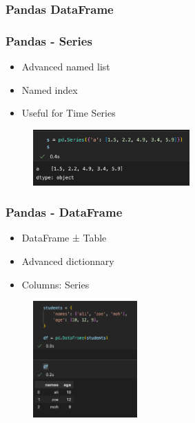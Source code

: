 \subsubsection{Pandas DataFrame}



\begin{frame}\frametitle{Pandas - Series}
   \begin{minipage}{0.48\linewidth}
      \begin{itemize}
         \item Advanced named list
         \item Named index
         \item Useful for Time Series
      \end{itemize}
   \end{minipage}
   \begin{minipage}{0.48\linewidth}
      \begin{figure}[H]
         \includegraphics[width=6cm]{../images/illustrations/pandas_create_series.png}
      \end{figure}
   \end{minipage}
\end{frame}


\begin{frame}\frametitle{Pandas - DataFrame}
   \begin{minipage}{0.48\linewidth}
      \begin{itemize}
         \item DataFrame ± Table
         \item Advanced dictionnary
         \item Columns: Series
      \end{itemize}
   \end{minipage}
   \begin{minipage}{0.48\linewidth}
      \begin{figure}[H]
         \includegraphics[width=4cm]{../images/illustrations/pandas_create_df.png}
      \end{figure}
   \end{minipage}
\end{frame}


